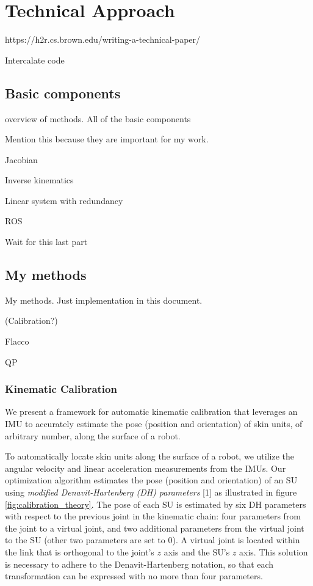 \chapter{Technical Approach}
\label{techchap}


https://h2r.cs.brown.edu/writing-a-technical-paper/

Intercalate code

\section{Basic components}

overview of methods. All of the basic components

Mention this because they are important for my work.

Jacobian

Inverse kinematics

Linear system with redundancy

ROS



Wait for this last part

\section{My methods}

My methods. Just implementation in this document.

(Calibration?)

Flacco

QP

\subsection{Kinematic Calibration}

We present a framework for automatic kinematic calibration that leverages an
IMU to accurately estimate the pose (position and orientation) of skin units,
of arbitrary number, along the surface of a robot.

To automatically locate skin units along the surface of a robot,
we utilize the angular velocity and linear acceleration measurements from the IMUs.
Our optimization algorithm estimates the pose (position and orientation) of an SU
using \textit{modified Denavit-Hartenberg (DH) parameters} [1] as illustrated in figure \ref{fig:calibration_theory}.
The pose of each SU is estimated by six DH parameters with respect to the previous
joint in the kinematic chain: four parameters from the joint to a virtual joint,
and two additional parameters from the virtual joint to the SU (other two parameters are set to $0$).
A virtual joint is located within the link that is orthogonal to the joint’s $z$ axis and the SU’s $z$ axis.
This solution is necessary to adhere to the Denavit-Hartenberg notation,
so that each transformation can be expressed with no more than four parameters.

